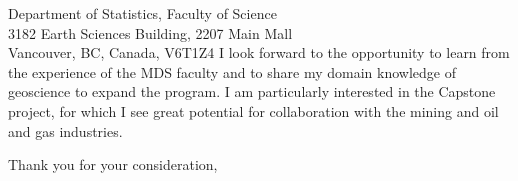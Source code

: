 \documentclass[11pt]{letter}
\begin{document}
\begin{letter}{
    Department of Statistics, Faculty of Science
    \\
    3182 Earth Sciences Building, 2207 Main Mall
    \\
    Vancouver, BC, Canada, V6T1Z4
}
I look forward to the opportunity to learn from the experience of the MDS
faculty and to share my domain knowledge of geoscience to expand the program.
I am particularly interested in the Capstone project, for which I see great
potential for collaboration with the mining and oil and gas industries.


\closing{Thank you for your consideration,}

\end{letter}
\end{document}
